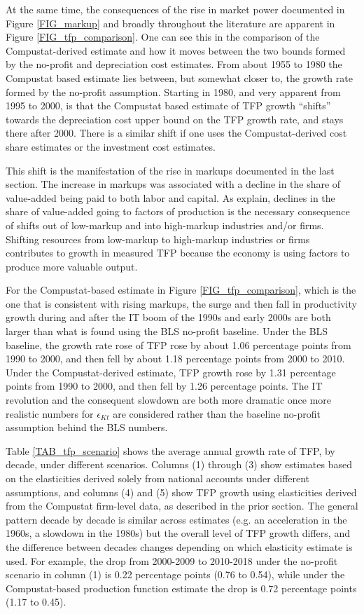 \documentclass[11pt]{article}
\begin{document}
At the same time, the consequences of the rise in market power documented in Figure \ref{FIG_markup} and broadly throughout the literature are apparent in Figure \ref{FIG_tfp_comparison}. One can see this in the comparison of the Compustat-derived estimate and how it moves between the two bounds formed by the no-profit and depreciation cost estimates. From about 1955 to 1980 the Compustat based estimate lies between, but somewhat closer to, the growth rate formed by the no-profit assumption. Starting in 1980, and very apparent from 1995 to 2000, is that the Compustat based estimate of TFP growth ``shifts'' towards the depreciation cost upper bound on the TFP growth rate, and stays there after 2000. There is a similar shift if one uses the Compustat-derived cost share estimates or the investment cost estimates. 

This shift is the manifestation of the rise in markups documented in the last section. The increase in markups was associated with a decline in the share of value-added being paid to both labor and capital. As \cite{bfshortnote,bfprodge} explain, declines in the share of value-added going to factors of production is the necessary consequence of shifts out of low-markup and into high-markup industries and/or firms. Shifting resources from low-markup to high-markup industries or firms contributes to growth in measured TFP because the economy is using factors to produce more valuable output. 

For the Compustat-based estimate in Figure \ref{FIG_tfp_comparison}, which is the one that is consistent with rising markups, the surge and then fall in productivity growth during and after the IT boom of the 1990s and early 2000s are both larger than what is found using the BLS no-profit baseline. Under the BLS baseline, the growth rate rose of TFP rose by about 1.06 percentage points from 1990 to 2000, and then fell by about 1.18 percentage points from 2000 to 2010. Under the Compustat-derived estimate, TFP growth rose by 1.31 percentage points from 1990 to 2000, and then fell by 1.26 percentage points. The IT revolution and the consequent slowdown are both more dramatic once more realistic numbers for $\epsilon_{Kt}$ are considered rather than the baseline no-profit assumption behind the BLS numbers. 

Table \ref{TAB_tfp_scenario} shows the average annual growth rate of TFP, by decade, under different scenarios. Columns (1) through (3) show estimates based on the elasticities derived solely from national accounts under different assumptions, and columns (4) and (5) show TFP growth using elasticities derived from the Compustat firm-level data, as described in the prior section. The general pattern decade by decade is similar across estimates (e.g. an acceleration in the 1960s, a slowdown in the 1980s) but the overall level of TFP growth differs, and the difference between decades changes depending on which elasticity estimate is used. For example, the drop from 2000-2009 to 2010-2018 under the no-profit scenario in column (1) is 0.22 percentage points (0.76 to 0.54), while under the Compustat-based production function estimate the drop is 0.72 percentage points (1.17 to 0.45).
\end{document}
